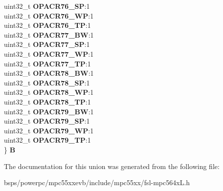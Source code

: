 \begin{DoxyCompactItemize}
\begin{tabbing}
\>uint32\_t {\bfseries OPACR76\_SP}:1\\
\>uint32\_t {\bfseries OPACR76\_WP}:1\\
\>uint32\_t {\bfseries OPACR76\_TP}:1\\
\>uint32\_t {\bfseries OPACR77\_BW}:1\\
\>uint32\_t {\bfseries OPACR77\_SP}:1\\
\>uint32\_t {\bfseries OPACR77\_WP}:1\\
\>uint32\_t {\bfseries OPACR77\_TP}:1\\
\>uint32\_t {\bfseries OPACR78\_BW}:1\\
\>uint32\_t {\bfseries OPACR78\_SP}:1\\
\>uint32\_t {\bfseries OPACR78\_WP}:1\\
\>uint32\_t {\bfseries OPACR78\_TP}:1\\
\>uint32\_t {\bfseries OPACR79\_BW}:1\\
\>uint32\_t {\bfseries OPACR79\_SP}:1\\
\>uint32\_t {\bfseries OPACR79\_WP}:1\\
\>uint32\_t {\bfseries OPACR79\_TP}:1\\
\} {\bfseries B}\\

\end{tabbing}\end{DoxyCompactItemize}


The documentation for this union was generated from the following file\+:\begin{DoxyCompactItemize}
\item 
bsps/powerpc/mpc55xxevb/include/mpc55xx/fsl-\/mpc564x\+L.\+h\end{DoxyCompactItemize}
